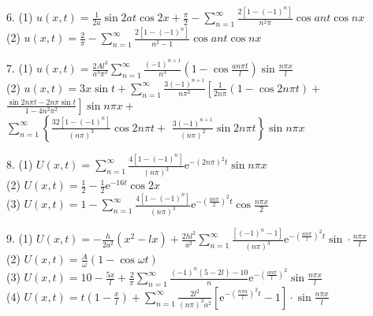\begin{solution}
6. (1) $ u(x, t)=\frac{1}{2 a} \sin 2 a t \cos 2 x+\frac{\pi}{2}-\sum_{n=1}^{\infty} \frac{2\left[1-(-1)^{n}\right]}{n^{2} \pi} \cos a n t \cos n x $\\
(2) $ u(x, t)=\frac{2}{\pi}-\sum\limits_{n=1}^{\infty} \frac{2\left[1-(-1)^{n}\right]}{n^{2}-1} \cos a n t \cos n x $

7. (1) $ u(x, t)=\frac{2 A l^{3}}{a^{3} \pi^{3}} \sum\limits_{n=1}^{\infty} \frac{(-1)^{n+1}}{n^{3}}\left(1-\cos \frac{a n \pi t}{l}\right) \sin \frac{n \pi x}{l} $\\
(2) $ u(x, t)=3 x \sin t+\sum\limits_{n=1}^{\infty} \frac{3(-1)^{n+1}}{n \pi^{2}}\left[\frac{1}{2 n \pi}(1-\cos 2 n \pi t)+\right. $
$ \left.\frac{\sin 2 n \pi t-2 n \pi \sin t}{1-4 n^{2} \pi^{2}}\right] \sin n \pi x+$\\$\sum\limits_{n=1}^{\infty}\left\{\frac{32\left[1-(-1)^{n}\right]}{(n \pi)^{3}} \cos 2 n \pi t+\right. $ $ \left.\frac{3(-1)^{n+1}}{(n \pi)^{2}} \sin 2 n \pi t\right\} \sin n \pi x $

8. (1) $ U(x, t)=\sum\limits_{n=1}^{\infty} \frac{4\left[1-(-1)^{n}\right]}{(n \pi)^{3}} \mathrm{e}^{-(2 n \pi)^{2} t} \sin n \pi x $\\
(2) $ U(x, t)=\frac{1}{2}-\frac{1}{2} \mathrm{e}^{-16 t} \cos 2 x $\\
(3) $ U(x, t)=1-\sum\limits_{n=1}^{\infty} \frac{4\left[1-(-1)^{n}\right]}{(n \pi)^{3}} \mathrm{e}^{-\left(\frac{a n \pi}{2}\right)^{2} t} \cos \frac{n \pi x}{2} $

9. (1) $ U(x, t)=-\frac{h}{2 a^{2}}\left(x^{2}-l x\right)+\frac{2 h l^{2}}{a^{2}} \sum\limits_{n=1}^{\infty} \frac{\left[(-1)^{n}-1\right]}{(n \pi)^{3}} \mathrm{e}^{-\left(\frac{a n \pi}{l}\right)^{2} t} \sin \cdot \frac{n \pi x}{l} $\\
(2) $ U(x, t)=\frac{A}{\omega}(1-\cos \omega t) $\\
(3) $ U(x, t)=10-\frac{5 x}{l}+\frac{2}{\pi} \sum\limits_{n=1}^{\infty} \frac{(-1)^{n}(5-2 l)-10}{n} \mathrm{e}^{-\left(\frac{a n \pi}{l}\right)^{2}} \sin \frac{n \pi x}{l} $\\
(4) $ U(x, t)=t\left(1-\frac{x}{l}\right)+\sum\limits_{n=1}^{\infty} \frac{2 l^{2}}{(n \pi)^{3} a^{2}}\left[\mathrm{e}^{-\left(\frac{n \pi a}{l}\right)^{2} t}-1\right] \cdot \sin \frac{n \pi x}{l} $


\end{solution}
